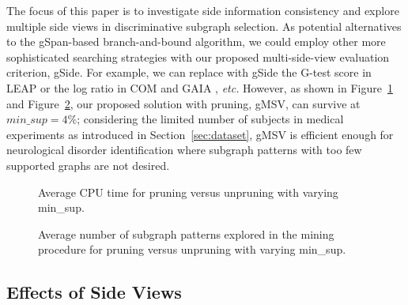\documentclass[conference]{IEEEtran}
\newcommand{\gscore}[0]{gSide}
\newcommand{\galgo}[0]{gMSV}
\begin{document}
The focus of this paper is to investigate side information consistency and explore multiple side views in discriminative subgraph selection. As potential alternatives to the gSpan-based branch-and-bound algorithm, we could employ other more sophisticated searching strategies with our proposed multi-side-view evaluation criterion, {\gscore}. For example, we can replace with {\gscore} the G-test score in LEAP \cite{yan2008mining} or the log ratio in COM \cite{jin2009graph} and GAIA \cite{jin2010gaia}, \emph{etc.} However, as shown in Figure~\ref{fig:time} and Figure~\ref{fig:num_fea}, our proposed solution with pruning, {\galgo}, can survive at $min\_sup=4\%$; considering the limited number of subjects in medical experiments as introduced in Section~\ref{sec:dataset}, {\galgo} is efficient enough for neurological disorder identification where subgraph patterns with too few supported graphs are not desired.

\begin{figure}
\centering
\caption{Average CPU time for pruning versus unpruning with varying min\_sup.}\label{fig:time}
\end{figure}\begin{figure}
\centering
\caption{Average number of subgraph patterns explored in the mining procedure for pruning versus unpruning with varying min\_sup.}\label{fig:num_fea}
\end{figure}\subsection{Effects of Side Views}
\end{document}
